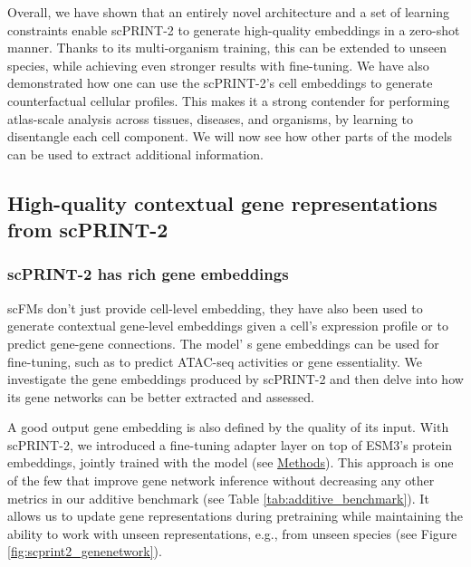 Overall, we have shown that an entirely novel architecture and a set of
learning constraints enable \gls{scPRINT}-2 to generate high-quality
embeddings in a zero-shot manner. Thanks to its multi-organism training,
this can be extended to unseen species, while achieving even stronger
results with fine-tuning. We have also demonstrated how one can use the
\gls{scPRINT}-2's cell embeddings to generate counterfactual cellular
profiles. This makes it a strong contender for performing atlas-scale
analysis across tissues, diseases, and organisms, by learning to
disentangle each cell component. We will now see how other parts of the
models can be used to extract additional information.

\subsection{High-quality contextual gene representations from
scPRINT-2}\label{high-quality-contextual-gene-representations-from-scprint-2}

\subsubsection{scPRINT-2 has rich gene
embeddings}\label{scprint-2-has-rich-gene-embeddings}

\gls{scFM}s don't just provide cell-level embedding, they have also been used
to generate contextual gene-level embeddings given a cell's expression
profile or to predict gene-gene connections. The model' s
gene embeddings can be used for fine-tuning, such as to predict \gls{ATAC-seq}
activities or gene essentiality\citep{cuiScGPTBuildingFoundation2024,theodorisTransferLearningEnables2023}. We investigate the
gene embeddings produced by \gls{scPRINT}-2 and then delve into how its gene
networks can be better extracted and assessed.

A good output gene embedding is also defined by the quality of its
input. With \gls{scPRINT}-2, we introduced a fine-tuning adapter layer on top
of \gls{ESM}3's protein embeddings, jointly trained with the model (see \hyperref[methods]{Methods}).
This approach is one of the few that improve gene network inference
without decreasing any other metrics in our additive benchmark (see
Table \ref{tab:additive_benchmark}). It allows us to update gene representations during
pretraining while maintaining the ability to work with unseen
representations, e.g., from unseen species (see Figure \ref{fig:scprint2_genenetwork}).

